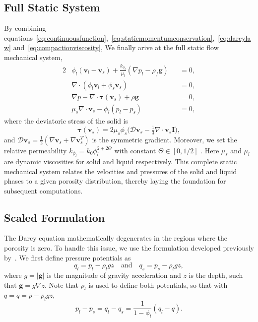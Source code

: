 \subsection{Full Static System}
By combining equations~\eqref{eq:continuousfunction},~\eqref{eq:staticmomentumconservation},~\eqref{eq:darcylaw} 
and~\eqref{eq:compactionviscosity},
We finally arive at the full static flow mechanical system,
\begin{alignat}{2}
    \label{eq:darcy}
		  &\phi_l (\mathbf{v}_l - \mathbf{v}_s)
		  + \frac{k_{\phi_l}}{\mu_l}(\nabla p_l - \rho_f\mathbf{g})
	    &&= 0,\\
	\label{eq:continuous}
		  &\nabla \cdot (\phi_l\mathbf{v}_l + \phi_s\mathbf{v}_s) &&=0,\\
	\label{eq:stokes}
		  &\nabla\bar p - \nabla \cdot \pmb{\tau}(\mathbf{v}_s) + \overline{\rho}\mathbf{g}&&= 0,\\
	\label{eq:compaction}
		  &\mu_s\nabla \cdot \mathbf{v}_s - \phi_l(p_l - p_s) &&=0, 
\end{alignat}
where the deviatoric stress of the solid is
\begin{equation}\label{eq:deviatoricstress}
		  \pmb{\tau}(\mathbf{v}_s)
		  = 2\mu_s\phi_s\big(\mathcal{D} \mathbf{v}_s - \tfrac{1}{3}\nabla \cdot \mathbf{v}_s \mathbf{I}\big),
\end{equation}
and $\mathcal{D} \mathbf{v}_s=\frac{1}{2}(\nabla\mathbf{v}_s + \nabla\mathbf{v}_s^T)$ is the symmetric gradient.
Moreover, we set the relative permeability 
$k_{\phi_l} = k_0 \phi_l^{2+2\Theta}$ with constant 
$\Theta \in [0,1/2]$ . Here $\mu_s$ 
and $\mu_l$ are dynamic viscosities for solid and liquid respectively.
This complete static mechanical system relates the velocities and pressures of 
the solid and liquid phases to a given porosity distribution, 
thereby laying the foundation for subsequent computations.

\subsection{Scaled Formulation}
The Darcy equation mathematically degenerates in the regions where 
the porosity is zero.
To handle this issue, we use the formulation developed 
previously by~\citet{DegenerateDarcy}. We first define pressure potentials as
\begin{equation}
	q_l = p_l - \rho_l g z\quad\text{and}\quad q_s = p_s - \rho_l g z,
\end{equation}
where $g=|\mathbf{g}|$ is the magnitude of gravity acceleration and $z$ is the 
depth, such that $\mathbf{g}=g\nabla z$. Note that $\rho_l$ is used to define 
both potentials, so that with $q=\bar q = \bar p - \rho_l g z$,
\begin{equation*}
	p_l - p_s = q_l - q_s = \frac{1}{1-\phi_l}(q_l - q).
\end{equation*}

